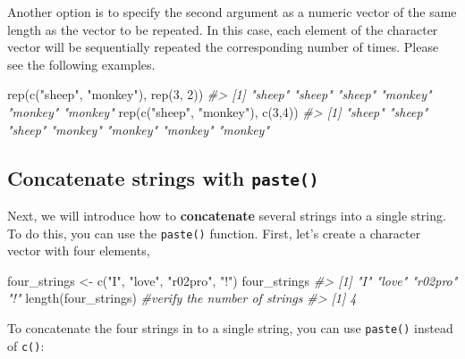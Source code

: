 \documentclass[
]{book}
\newenvironment{Shaded}{\begin{snugshade}}{\end{snugshade}}
\newcommand{\CommentTok}[1]{\textcolor[rgb]{0.56,0.35,0.01}{\textit{#1}}}
\newcommand{\DecValTok}[1]{\textcolor[rgb]{0.00,0.00,0.81}{#1}}
\newcommand{\FunctionTok}[1]{\textcolor[rgb]{0.00,0.00,0.00}{#1}}
\newcommand{\NormalTok}[1]{#1}
\newcommand{\OtherTok}[1]{\textcolor[rgb]{0.56,0.35,0.01}{#1}}
\newcommand{\StringTok}[1]{\textcolor[rgb]{0.31,0.60,0.02}{#1}}
\begin{document}
Another option is to specify the second argument as a numeric vector of the same length as the vector to be repeated. In this case, each element of the character vector will be sequentially repeated the corresponding number of times. Please see the following examples.

\begin{Shaded}
\begin{Highlighting}[]
\FunctionTok{rep}\NormalTok{(}\FunctionTok{c}\NormalTok{(}\StringTok{"sheep"}\NormalTok{, }\StringTok{"monkey"}\NormalTok{), }\FunctionTok{rep}\NormalTok{(}\DecValTok{3}\NormalTok{, }\DecValTok{2}\NormalTok{))}
\CommentTok{\#\textgreater{} [1] "sheep"  "sheep"  "sheep"  "monkey" "monkey" "monkey"}
\FunctionTok{rep}\NormalTok{(}\FunctionTok{c}\NormalTok{(}\StringTok{"sheep"}\NormalTok{, }\StringTok{"monkey"}\NormalTok{), }\FunctionTok{c}\NormalTok{(}\DecValTok{3}\NormalTok{,}\DecValTok{4}\NormalTok{))}
\CommentTok{\#\textgreater{} [1] "sheep"  "sheep"  "sheep"  "monkey" "monkey" "monkey" "monkey"}
\end{Highlighting}
\end{Shaded}

\hypertarget{concatenate-strings-with-paste}{%
\subsection{\texorpdfstring{Concatenate strings with \texttt{paste()}}{Concatenate strings with paste()}}\label{concatenate-strings-with-paste}}

Next, we will introduce how to \textbf{concatenate} several strings into a single string. To do this, you can use the \texttt{paste()} function. First, let's create a character vector with four elements,

\begin{Shaded}
\begin{Highlighting}[]
\NormalTok{four\_strings }\OtherTok{\textless{}{-}} \FunctionTok{c}\NormalTok{(}\StringTok{"I"}\NormalTok{, }\StringTok{"love"}\NormalTok{, }\StringTok{"r02pro"}\NormalTok{, }\StringTok{"!"}\NormalTok{)}
\NormalTok{four\_strings}
\CommentTok{\#\textgreater{} [1] "I"      "love"   "r02pro" "!"}
\FunctionTok{length}\NormalTok{(four\_strings) }\CommentTok{\#verify the number of strings}
\CommentTok{\#\textgreater{} [1] 4}
\end{Highlighting}
\end{Shaded}

To concatenate the four strings in to a single string, you can use \texttt{paste()} instead of \texttt{c()}:
\end{document}
